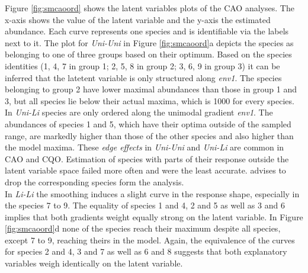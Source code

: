 		\newpage
		Figure \ref{fig:smcaoord} shows the latent variables plots of the CAO analyses. 
		The x-axis shows the value of the latent variable and the y-axis the estimated abundance.
		Each curve represents one species and is identifiable via the labels next to it.
		The plot for \textit{Uni-Uni} in Figure \ref{fig:smcaoord}a depicts the species as belonging to one of three groups based on their optimum.
		Based on the species identities (1, 4, 7 in group 1; 2, 5, 8 in group 2; 3, 6, 9 in group 3) it can be inferred that the latetent variable is only structured along \textit{env1}.
		The species belonging to group 2 have lower maximal abundances than those in group 1 and 3, but all species lie below their actual maxima, which is 1000 for every species.  
		In \textit{Uni-Li} species are only ordered along the unimodal gradient \textit{env1}.
		The abundances of species 1 and 5, which have their optima outside of the sampled range, are markedly higher than those of the other species and also higher than the model maxima.
		These \textit{edge effects} in \textit{Uni-Uni} and \textit{Uni-Li} are common in CAO and CQO. 
		Estimation of species with parts of their response outside the latent variable space failed more often and were the least accurate. \citet{yee2015vector} advises to drop the corresponding species form the analysis.\\
		In \textit{Li-Li} the smoothing induces a slight curve in the response shape, especially in the species 7 to 9. 
		The equality of species 1 and 4, 2 and 5 as well as 3 and 6 implies that both gradients weight equally strong on the latent variable. 
		In Figure \ref{fig:smcaoord}d none of the species reach their maximum despite all species, except 7 to 9, reaching theirs in the model. 
		Again, the equivalence of the curves for species 2 and 4, 3 and 7 as well as 6 and 8 suggests that both explanatory variables weigh identically on the latent variable. 
	
